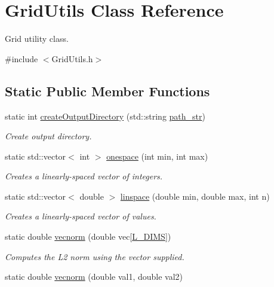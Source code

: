 \hypertarget{class_grid_utils}{}\section{Grid\+Utils Class Reference}
\label{class_grid_utils}


Grid utility class.  




{\ttfamily \#include $<$Grid\+Utils.\+h$>$}

\subsection*{Static Public Member Functions}
\begin{DoxyCompactItemize}
\item 
static int \hyperlink{class_grid_utils_ae2c829e8787d4aa03ec961dc84213b0d}{create\+Output\+Directory} (std\+::string \hyperlink{class_grid_utils_a9b58748e9e05e84852962d7abc7942e3}{path\+\_\+str})
\begin{DoxyCompactList}\small\item\em Create output directory. \end{DoxyCompactList}\item 
static std\+::vector$<$ int $>$ \hyperlink{class_grid_utils_a1f0d4a76be76a743c368c9a1d4d46cbc}{onespace} (int min, int max)
\begin{DoxyCompactList}\small\item\em Creates a linearly-\/spaced vector of integers. \end{DoxyCompactList}\item 
static std\+::vector$<$ double $>$ \hyperlink{class_grid_utils_a2f172a6dd8b2749ca1c8336a64a07e29}{linspace} (double min, double max, int n)
\begin{DoxyCompactList}\small\item\em Creates a linearly-\/spaced vector of values. \end{DoxyCompactList}\item 
static double \hyperlink{class_grid_utils_a1e0d0da69ec1543835b98bca884f8927}{vecnorm} (double vec\mbox{[}\hyperlink{definitions_8h_a31d5945080ee5c34edc32e6f74c724c8}{L\+\_\+\+D\+I\+MS}\mbox{]})
\begin{DoxyCompactList}\small\item\em Computes the L2 norm using the vector supplied. \end{DoxyCompactList}\item 
static double \hyperlink{class_grid_utils_ae7d797edf50b3c3a448d59684a135aee}{vecnorm} (double val1, double val2)

\end{DoxyCompactItemize}
